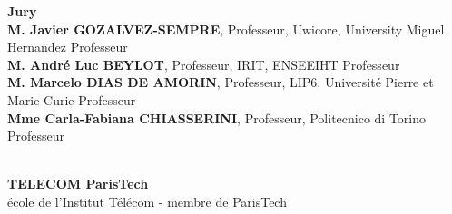 \documentclass[11pt,a4paper]{book}
\begin{document}
%
%
%
\vfill
%
%
%
\flushleft
\begin{minipage}{.9\textwidth}	%
{\bf Jury}\\
{\bf M. Javier GOZALVEZ-SEMPRE}, {\small Professeur, Uwicore, University Miguel Hernandez}
	\hfill Professeur\\
{\bf M. Andr\'{e} Luc BEYLOT}, {\small Professeur, IRIT, ENSEEIHT}
	\hfill Professeur\\
{\bf M. Marcelo DIAS DE AMORIN}, {\small Professeur, LIP6, Universit\'{e} Pierre et Marie Curie}
	\hfill Professeur\\
{\bf Mme Carla-Fabiana CHIASSERINI}, {\small Professeur, Politecnico di Torino}
	\hfill Professeur\\
\end{minipage}\\
%
%
%
\vspace{-.3cm}
%
%
%
\centering
{\bf TELECOM ParisTech}\\
{\small école de l'Institut Télécom - membre de ParisTech}
%
%
%
\end{document}

